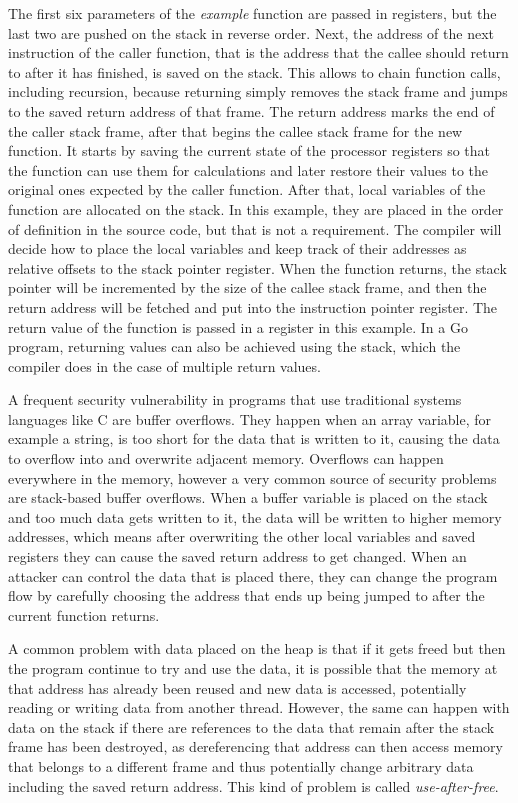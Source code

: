 The first six parameters of the \textit{example} function are passed in registers, but the last two are pushed on the
stack in reverse order.
Next, the address of the next instruction of the caller function, that is the address that the callee should return
to after it has finished, is saved on the stack.
This allows to chain function calls, including recursion, because returning simply removes the stack frame and jumps
to the saved return address of that frame.
The return address marks the end of the caller stack frame, after that begins the callee stack frame for the new
function.
It starts by saving the current state of the processor registers so that the function can use them for calculations and
later restore their values to the original ones expected by the caller function.
After that, local variables of the function are allocated on the stack.
In this example, they are placed in the order of definition in the source code, but that is not a requirement.
The compiler will decide how to place the local variables and keep track of their addresses as relative offsets to the
stack pointer register.
When the function returns, the stack pointer will be incremented by the size of the callee stack frame, and then the
return address will be fetched and put into the instruction pointer register.
The return value of the function is passed in a register in this example.
In a Go program, returning values can also be achieved using the stack, which the compiler does in the case of multiple
return values.



A frequent security vulnerability in programs that use traditional systems languages like C are buffer overflows.
They happen when an array variable, for example a string, is too short for the data that is written to it, causing the
data to overflow into and overwrite adjacent memory.
Overflows can happen everywhere in the memory, however a very common source of security problems are stack-based buffer
overflows.
When a buffer variable is placed on the stack and too much data gets written to it, the data will be written to higher
memory addresses, which means after overwriting the other local variables and saved registers they can cause the saved
return address to get changed.
When an attacker can control the data that is placed there, they can change the program flow by carefully choosing the
address that ends up being jumped to after the current function returns.

A common problem with data placed on the heap is that if it gets freed but then the program continue to try and use the
data, it is possible that the memory at that address has already been reused and new data is accessed, potentially
reading or writing data from another thread.
However, the same can happen with data on the stack if there are references to the data that remain after the stack
frame has been destroyed, as dereferencing that address can then access memory that belongs to a different frame and
thus potentially change arbitrary data including the saved return address.
This kind of problem is called \textit{use-after-free}.


